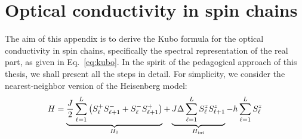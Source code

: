 \chapter{Optical conductivity in spin chains\label{app:opt_cond}}
\thispagestyle{chapterBeginStyle}


The aim of this appendix is to derive the Kubo formula for the optical conductivity in spin chains,
specifically the spectral representation of the real part, as given in Eq.~\eqref{eq:kubo}.
In the spirit of the pedagogical approach of this thesis, we shall present all the steps in detail.
For simplicity, we consider the nearest-neighbor version of the Heisenberg model:
\begin{equation}
    H =  \underbrace{\frac{J}{2} \sum_{\ell=1}^{L} \left(S^{+}_{\ell} S^{-}_{\ell+1} + S^{-}_{\ell}S^{+}_{\ell+1} \right)}_{H_{0}}
    + \underbrace{J \Delta  \sum_{\ell=1}^{L} S^{z}_{\ell}S^{z}_{\ell+1}}_{H_{\text{int}}}
    - h \sum_{\ell=1}^{L} S^{z}_{\ell}
    \label{eq:nn_heisenberg}
\end{equation}

